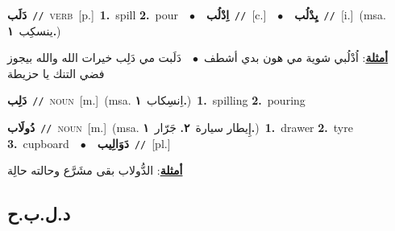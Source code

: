 \documentclass[10pt,a4paper,twoside]{article} %
\begin{document}
\begin{multicols}{2}
{\setlength\topsep{0pt}\textbf{\foreignlanguage{arabic}{دَلَب}}\ {\color{gray}\texttt{//}\color{black}}\ \textsc{verb}\ [p.]\ \textbf{1.}~spill  \textbf{2.}~pour\ \ $\bullet$\ \ \setlength\topsep{0pt}\textbf{\foreignlanguage{arabic}{اِدْلُب}}\ {\color{gray}\texttt{//}\color{black}}\ [c.]\ \ $\bullet$\ \ \setlength\topsep{0pt}\textbf{\foreignlanguage{arabic}{يِدْلُب}}\ {\color{gray}\texttt{//}\color{black}}\ [i.]\ \color{gray}(msa. \foreignlanguage{arabic}{ينسكِب}~\foreignlanguage{arabic}{\textbf{١.}})\color{black}\  \begin{flushright}\color{gray}\foreignlanguage{arabic}{\textbf{\underline{\foreignlanguage{arabic}{أمثلة}}}: اُدْلُبي شوية مي هون بدي أشطف\ $\bullet$\ \  دَلَبت مي دَلِب خيرات الله والله بيجوز فضي التنك يا حزيطة}\end{flushright}\color{black}} \vspace{2mm}

{\setlength\topsep{0pt}\textbf{\foreignlanguage{arabic}{دَلِب}}\ {\color{gray}\texttt{//}\color{black}}\ \textsc{noun}\ [m.]\ \color{gray}(msa. \foreignlanguage{arabic}{اِنسِكاب}~\foreignlanguage{arabic}{\textbf{١.}})\color{black}\ \textbf{1.}~spilling  \textbf{2.}~pouring\ } \vspace{2mm}

{\setlength\topsep{0pt}\textbf{\foreignlanguage{arabic}{دُولَاب}}\ {\color{gray}\texttt{//}\color{black}}\ \textsc{noun}\ [m.]\ \color{gray}(msa. \foreignlanguage{arabic}{إِيطار سيارة}~\foreignlanguage{arabic}{\textbf{٢.}}  \foreignlanguage{arabic}{جَرّار}~\foreignlanguage{arabic}{\textbf{١.}})\color{black}\ \textbf{1.}~drawer  \textbf{2.}~tyre  \textbf{3.}~cupboard\ \ $\bullet$\ \ \setlength\topsep{0pt}\textbf{\foreignlanguage{arabic}{دَوَالِيب}}\ {\color{gray}\texttt{//}\color{black}}\ [pl.]\  \begin{flushright}\color{gray}\foreignlanguage{arabic}{\textbf{\underline{\foreignlanguage{arabic}{أمثلة}}}: الدُّولاب بقى مشَرَّع وحالته حالِة}\end{flushright}\color{black}} \vspace{2mm}

\vspace{-3mm}
\subsection*{\color{blue}\foreignlanguage{arabic}{د.ل.ب.ح}\color{blue}{}} 


\end{multicols}
\end{document}
